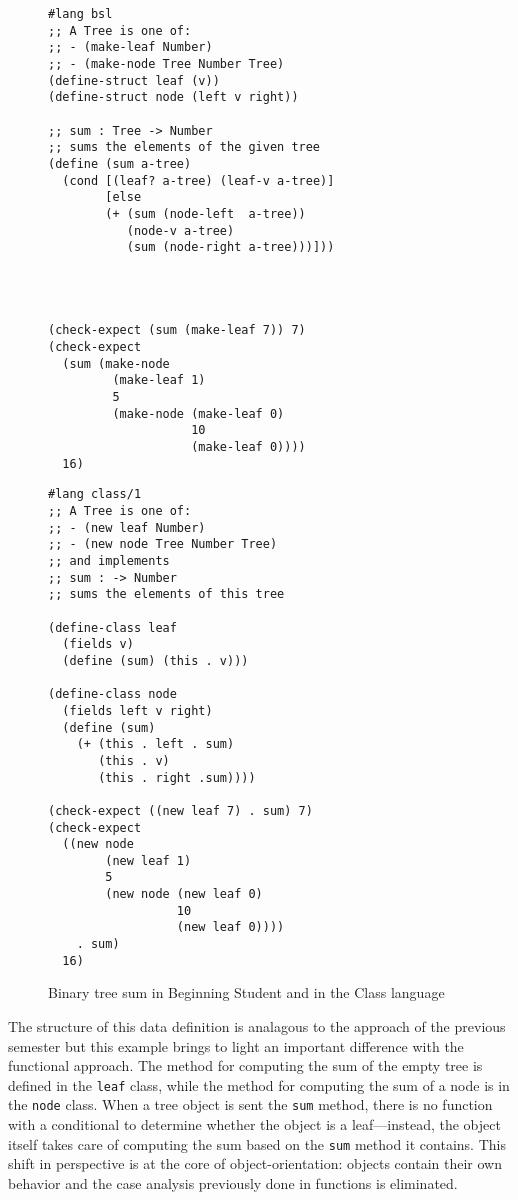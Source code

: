 \documentclass[submission,copyright]{eptcs}
\begin{document}
\begin{figure}[h!]
\begin{minipage}[t]{3.5in}
\begin{verbatim}
#lang bsl
;; A Tree is one of:
;; - (make-leaf Number)
;; - (make-node Tree Number Tree)
(define-struct leaf (v))
(define-struct node (left v right))

;; sum : Tree -> Number
;; sums the elements of the given tree
(define (sum a-tree)
  (cond [(leaf? a-tree) (leaf-v a-tree)]
        [else
        (+ (sum (node-left  a-tree))
           (node-v a-tree)
           (sum (node-right a-tree)))]))




(check-expect (sum (make-leaf 7)) 7)
(check-expect 
  (sum (make-node
         (make-leaf 1)
         5 
         (make-node (make-leaf 0)
                    10
                    (make-leaf 0))))
  16)
\end{verbatim}
\end{minipage}
\begin{minipage}[t]{3in}
\begin{verbatim}
#lang class/1
;; A Tree is one of:
;; - (new leaf Number)
;; - (new node Tree Number Tree)
;; and implements
;; sum : -> Number
;; sums the elements of this tree

(define-class leaf
  (fields v)
  (define (sum) (this . v)))

(define-class node
  (fields left v right)
  (define (sum)
    (+ (this . left . sum)
       (this . v)
       (this . right .sum))))

(check-expect ((new leaf 7) . sum) 7)
(check-expect 
  ((new node
        (new leaf 1)
        5 
        (new node (new leaf 0) 
                  10
                  (new leaf 0))))
    . sum)
  16)
\end{verbatim}
\end{minipage}
\caption{Binary tree sum in Beginning Student and in the Class language}
\label{fig:tree}
\end{figure}

The structure of this data definition is analagous to the approach of
the previous semester but this example brings to light an important
difference with the functional approach.  The method for computing the
sum of the empty tree is defined in the {\tt leaf} class, while the
method for computing the sum of a node is in the {\tt node} class.
When a tree object is sent the {\tt sum} method, there is no function
with a conditional to determine whether the object is a
leaf---instead, the object itself takes care of computing the sum
based on the {\tt sum} method it contains.  This shift in perspective
is at the core of object-orientation: objects contain their own
behavior and the case analysis previously done in functions is
eliminated.
\end{document}
